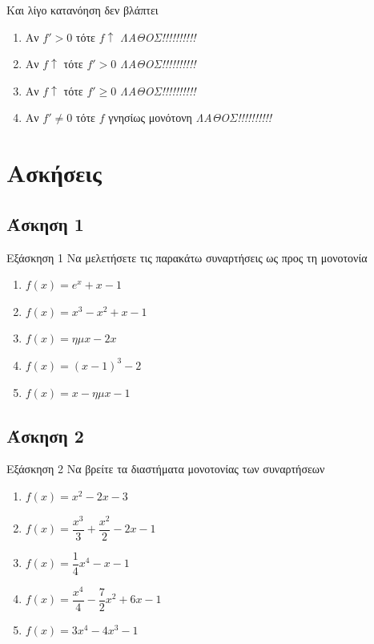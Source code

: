 \documentclass[greek]{beamer}
\begin{document}
\begin{frame}{Και λίγο κατανόηση δεν βλάπτει}
 \begin{enumerate}
  \item<1-> Αν $f'>0$ τότε $f\uparrow$  {\emph{ΛΑΘΟΣ!!!!!!!!!!}}
  \item<3-> Αν $f\uparrow$ τότε $f'>0$  {\emph{ΛΑΘΟΣ!!!!!!!!!!}}
  \item<5-> Αν $f\uparrow$ τότε $f'\ge 0$  {\emph{ΛΑΘΟΣ!!!!!!!!!!}}
  \item<7-> Αν $f'\ne 0$ τότε $f$ γνησίως μονότονη  {\emph{ΛΑΘΟΣ!!!!!!!!!!}}
 \end{enumerate}
\end{frame}

\section{Ασκήσεις}
\subsection{Άσκηση 1}
\begin{frame}[label=Άσκηση1]{Εξάσκηση 1}
 Να μελετήσετε τις παρακάτω συναρτήσεις ως προς τη μονοτονία
 \begin{enumerate}
  \item<1-> $f(x)=e^x+x-1$
  \item<2-> $f(x)=x^3-x^2+x-1$
  \item<3-> $f(x)=ημx-2x$
  \item<4-> $f(x)=(x-1)^3-2$
  \item<5-> $f(x)=x-ημx-1$
 \end{enumerate}

\end{frame}

\subsection{Άσκηση 2}
\begin{frame}[label=Άσκηση2]{Εξάσκηση 2}
 Να βρείτε τα διαστήματα μονοτονίας των συναρτήσεων
 \begin{enumerate}
  \item<1-> $f(x)=x^2-2x-3$
  \item<2-> $f(x)=\dfrac{x^3}{3}+\dfrac{x^2}{2}-2x-1$
  \item<3-> $f(x)=\dfrac{1}{4}x^4-x-1$
  \item<4-> $f(x)=\dfrac{x^4}{4}-\dfrac{7}{2}x^2+6x-1$
  \item<5-> $f(x)=3x^4-4x^3-1$
 \end{enumerate}

\end{frame}
\end{document}
